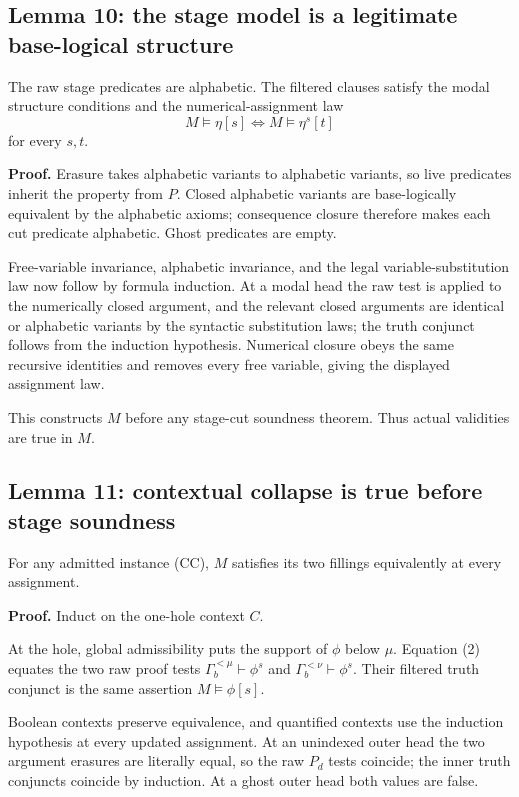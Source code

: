 \documentclass[
  11pt,
  letterpaper,
]{article}
\begin{document}
\subsection{Lemma 10: the stage model is a legitimate base-logical
structure}\label{lemma-10-the-stage-model-is-a-legitimate-base-logical-structure}

The raw stage predicates are alphabetic. The filtered clauses satisfy
the modal structure conditions and the numerical-assignment law \[
M\models\eta[s]\iff M\models\eta^s[t]
\] for every \(s,t\).

\textbf{Proof.} Erasure takes alphabetic variants to alphabetic
variants, so live predicates inherit the property from \(P\). Closed
alphabetic variants are base-logically equivalent by the alphabetic
axioms; consequence closure therefore makes each cut predicate
alphabetic. Ghost predicates are empty.

Free-variable invariance, alphabetic invariance, and the legal
variable-substitution law now follow by formula induction. At a modal
head the raw test is applied to the numerically closed argument, and the
relevant closed arguments are identical or alphabetic variants by the
syntactic substitution laws; the truth conjunct follows from the
induction hypothesis. Numerical closure obeys the same recursive
identities and removes every free variable, giving the displayed
assignment law.

This constructs \(M\) before any stage-cut soundness theorem. Thus
actual validities are true in \(M\).

\subsection{Lemma 11: contextual collapse is true before stage
soundness}\label{lemma-11-contextual-collapse-is-true-before-stage-soundness}

For any admitted instance (CC), \(M\) satisfies its two fillings
equivalently at every assignment.

\textbf{Proof.} Induct on the one-hole context \(C\).

At the hole, global admissibility puts the support of \(\phi\) below
\(\mu\). Equation (2) equates the two raw proof tests
\(\Gamma_b^{<\mu}\vdash\phi^s\) and \(\Gamma_b^{<\nu}\vdash\phi^s\).
Their filtered truth conjunct is the same assertion \(M\models\phi[s]\).

Boolean contexts preserve equivalence, and quantified contexts use the
induction hypothesis at every updated assignment. At an unindexed outer
head the two argument erasures are literally equal, so the raw \(P_d\)
tests coincide; the inner truth conjuncts coincide by induction. At a
ghost outer head both values are false.
\end{document}
